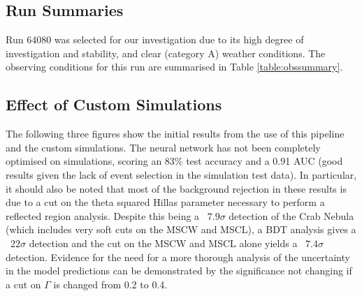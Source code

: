 \subsection{Run Summaries}
Run 64080 was selected for our investigation due to its high degree of investigation and stability, and clear (category A) weather conditions. The observing conditions for this run are summarised in Table \ref{table:obssummary}.
\begin{table}[h]
    \centering
    \caption{Observing summary for run 64080}
    \label{table:obssummary}
\end{table}

\subsection{Effect of Custom Simulations}
The following three figures show the initial results from the use of this pipeline and the custom simulations. The neural network has not been completely optimised on simulations, scoring an 83\% test accuracy and a 0.91 AUC (good results given the lack of event selection in the simulation test data). In particular, it should also be noted that most of the background rejection in these results is due to a cut on the theta squared Hillas parameter necessary to perform a reflected region analysis. Despite this being a ~$7.9\sigma$ detection of the Crab Nebula (which includes very soft cuts on the MSCW and MSCL), a BDT analysis gives a ~$22\sigma$ detection and the cut on the MSCW and MSCL alone yields a ~$7.4\sigma$ detection. Evidence for the need for a more thorough analysis of the  uncertainty in the model predictions can be demonstrated by the significance not changing if a cut on $\Gamma$ is changed from 0.2 to 0.4.


